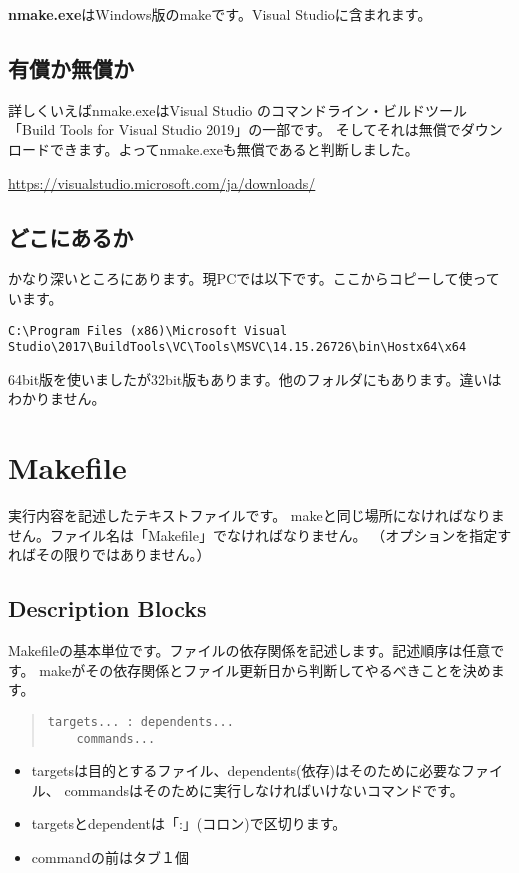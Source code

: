 \documentclass[dvipdfmx]{jsarticle}
\begin{document}
\textbf{nmake.exe}はWindows版のmakeです。Visual Studioに含まれます。

\subsection{有償か無償か}
詳しくいえばnmake.exeはVisual Studio のコマンドライン・ビルドツール
「Build Tools for Visual Studio 2019」の一部です。
そしてそれは無償でダウンロードできます。よってnmake.exeも無償であると判断しました。\par
\url{https://visualstudio.microsoft.com/ja/downloads/}


\subsection{どこにあるか}
かなり深いところにあります。現PCでは以下です。ここからコピーして使っています。
\begin{verbatim}
C:\Program Files (x86)\Microsoft Visual Studio\2017\BuildTools\VC\Tools\MSVC\14.15.26726\bin\Hostx64\x64
\end{verbatim}
64bit版を使いましたが32bit版もあります。他のフォルダにもあります。違いはわかりません。

\section{Makefile}
実行内容を記述したテキストファイルです。
makeと同じ場所になければなりません。ファイル名は「Makefile」でなければなりません。
（オプションを指定すればその限りではありません。）

\subsection{Description Blocks}
Makefileの基本単位です。ファイルの依存関係を記述します。記述順序は任意です。
makeがその依存関係とファイル更新日から判断してやるべきことを決めます。

\begin{quote}
\begin{verbatim}
targets... : dependents...
    commands...
\end{verbatim}
\end{quote}

\begin{itemize}
\item targetsは目的とするファイル、dependents(依存)はそのために必要なファイル、
commandsはそのために実行しなければいけないコマンドです。
\item targetsとdependentは「:」(コロン)で区切ります。
\item commandの前はタブ１個
\end{itemize}
\end{document}
